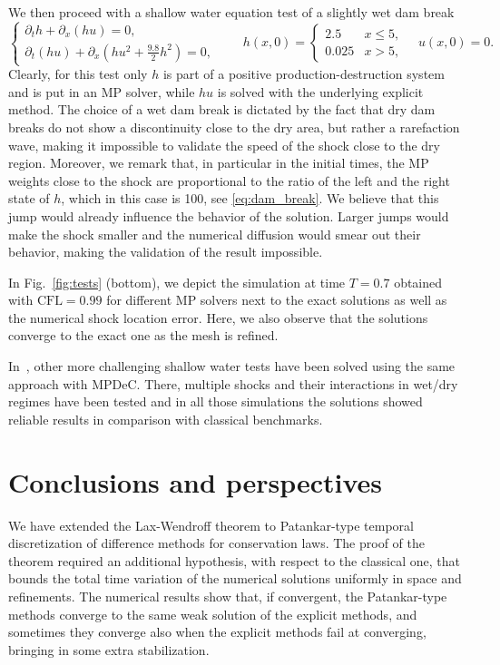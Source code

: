 \documentclass[final,11pt, times, linenumber, nopreprintline]{elsarticle}
\begin{document}
We then proceed with a shallow water equation test of a slightly wet dam break 
\begin{equation}\label{eq:dam_break}
	\begin{cases}
		\partial_t h + \partial_x (hu) =0,\\
		\partial_t (hu) + \partial_x (hu^2+\frac{9.8}{2}h^2) =0,
	\end{cases}
	\qquad
	h(x,0)=\begin{cases}
		2.5&x\leq 5,\\
		0.025&x> 5,
	\end{cases}
	\quad u(x,0)=0.
\end{equation}
Clearly, for this test only $h$ is part of a positive production-destruction system and is put in an MP solver, while $hu$ is solved with the underlying explicit method.
The choice of a wet dam break is dictated by the fact that dry dam breaks do not show a discontinuity close to the dry area, but rather a rarefaction wave, making it impossible to validate the speed of the shock close to the dry region.
Moreover, we remark that, in particular in the initial times, the MP weights close to the shock are proportional to the ratio of the left and the right state of $h$, which in this case is 100, see \eqref{eq:dam_break}. 
We believe that this jump would already influence the behavior of the solution. Larger jumps would make the shock smaller and the numerical diffusion would smear out their behavior, making the validation of the result impossible.

In Fig.~\ref{fig:tests} (bottom), we  depict the simulation at time $T=0.7$ obtained with $\text{CFL} =0.99$ for different MP solvers next to the exact solutions as well as the numerical shock location error. Here, we also observe that the solutions converge to the exact one as the mesh is refined.

In~\cite{ciallella2022arbitrary,ciallella2025high}, other more challenging shallow water tests have been solved using the same approach with MPDeC. There, multiple shocks and their interactions in wet/dry regimes have been tested and in all those simulations the solutions showed reliable results in comparison with classical 
benchmarks.

\section{Conclusions and perspectives}\label{se_conclusion} 
We have extended the Lax-Wendroff theorem to Patankar-type temporal discretization of difference methods for conservation laws. The proof of the theorem required an additional hypothesis, with respect to the classical one, that bounds the total time variation of the numerical solutions uniformly in space and refinements. 
The numerical results show that, if convergent, the Patankar-type methods converge to the same weak solution of the explicit methods, and sometimes they converge also when the explicit methods fail at converging, bringing in some extra stabilization.
\end{document}
